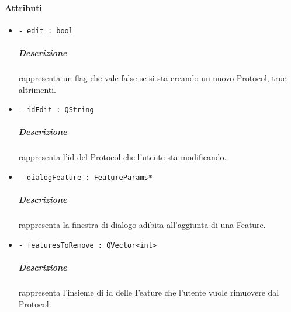 	\paragraph{Attributi}
		\begin{itemize}
			\item \color{teal} \verb!- edit : bool!
			\color{black}
			\subparagraph{Descrizione} rappresenta un flag che vale false se si sta creando un nuovo Protocol\g{}, true altrimenti.
			\item \color{teal} \verb!- idEdit : QString!
			\color{black}
			\subparagraph{Descrizione} rappresenta l'id del Protocol\g{} che l'utente sta modificando.
			\item \color{teal} \verb!- dialogFeature : FeatureParams*!
			\color{black}
			\subparagraph{Descrizione} rappresenta la finestra di dialogo adibita all'aggiunta di una Feature\g{}.
			\item \color{teal} \verb!- featuresToRemove : QVector<int>!
			\color{black}
			\subparagraph{Descrizione} rappresenta l'insieme di id delle Feature\g{} che l'utente vuole rimuovere dal Protocol\g{}.
		\end{itemize}
